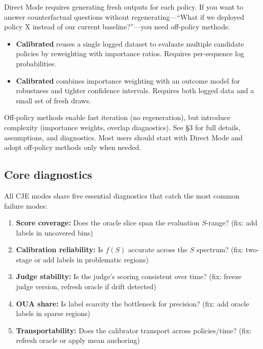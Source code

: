 Direct Mode requires generating fresh outputs for each policy. If you want to answer counterfactual questions without regenerating---``What if we deployed policy X instead of our current baseline?''---you need off-policy methods:

\begin{itemize}
\item \textbf{Calibrated \ips{}} reuses a single logged dataset to evaluate multiple candidate policies by reweighting with importance ratios. Requires per-sequence log probabilities.

\item \textbf{Calibrated \dr{}} combines importance weighting with an outcome model for robustness and tighter confidence intervals. Requires both logged data and a small set of fresh draws.
\end{itemize}

Off-policy methods enable fast iteration (no regeneration), but introduce complexity (importance weights, overlap diagnostics). See §3 for full details, assumptions, and diagnostics. Most users should start with Direct Mode and adopt off-policy methods only when needed.

\subsection{Core diagnostics}

All CJE modes share five essential diagnostics that catch the most common failure modes:

\begin{enumerate}[label=(\alph*)]
\item \textbf{Score coverage:} Does the oracle slice span the evaluation $S$-range? (fix: add labels in uncovered bins)

\item \textbf{Calibration reliability:} Is $f(S)$ accurate across the $S$ spectrum? (fix: two-stage \autocal{} or add labels in problematic regions)

\item \textbf{Judge stability:} Is the judge's scoring consistent over time? (fix: freeze judge version, refresh oracle if drift detected)

\item \textbf{OUA share:} Is label scarcity the bottleneck for precision? (fix: add oracle labels in sparse regions)

\item \textbf{Transportability:} Does the calibrator transport across policies/time? (fix: refresh oracle or apply mean anchoring)
\end{enumerate}

